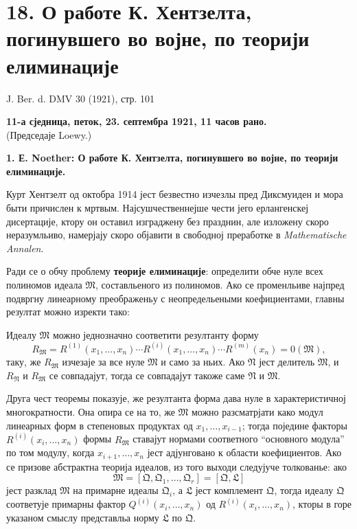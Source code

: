﻿\documentclass[11pt]{article}
\begin{document}

\setcounter{footnote}{0}
\section*{18. О работе К. Хентзелта, погинувшего во војне, по теорији елиминације}
\begin{center}
J. Ber. d. DMV 30 (1921), стр. 101
\end{center}

\begin{center}
\textbf{11-а сједница, петок, 23. септембра 1921, 11 часов рано.}\\
(Председаје Loewy.)
\end{center}

\textbf{1. Е. Noether: О работе К. Хентзелта, погинувшего во војне, по теорији елиминације.}

Курт Хентзелт од октобра 1914 јест безвестно изчезлы пред Диксмуиден и мора быти причислен к мртвым. Најсушчественнејше чести јего ерлангенскеј дисертације, ктору он оставил изграджену без празднин, але изложену скоро неразумльиво, намерјају скоро објавити в свободној преработке в \emph{Mathematische Annalen}.

Ради се о обчу проблему \textbf{теорије елиминације}: определити обче нуле всех полиномов идеала \(\mathfrak M\), составльеного из полиномов. Ако се променльиве најпред подвргну линеарному преображеньу с неопредельеными коефициентами, главны резултат можно изректи тако:

Идеалу \(\mathfrak M\) можно једнозначно соответити резултанту форму
\[
 R_{\mathfrak M}=R^{(1)}(x_1,
\ldots,x_n)\cdots R^{(i)}(x_1,
\ldots,x_n)\cdots R^{(m)}(x_n)=0(\mathfrak M),
\]
таку, же \(R_{\mathfrak M}\) изчезаје за все нуле \(\mathfrak M\) и само за ньих. Ако \(\mathfrak N\) јест делитель \(\mathfrak M\), и \(R_{\mathfrak N}\) и \(R_{\mathfrak M}\) се совпадајут, тогда се совпадајут такоже саме \(\mathfrak N\) и \(\mathfrak M\).

Друга чест теоремы показује, же резултанта форма дава нуле в характеристичној многократности. Она опира се на то, же \(\mathfrak M\) можно разсматрјати како модул линеарных форм в степеновых продуктах од \(x_1,
\ldots,x_{i-1}\); тогда поједине факторы \(R^{(i)}(x_i,
\ldots,x_n)\) формы \(R_{\mathfrak M}\) ставајут нормами соответного ``основного модула'' по том модулу, когда \(x_{i+1},
\ldots,x_n\) јест адјунговано к области коефициентов. Ако се призове абстрактна теорија идеалов, из того выходи следујуче толкованье: ако
\[
 \mathfrak M=[\mathfrak Q,\mathfrak Q_1,
\ldots,
\mathfrak Q_r]=[\mathfrak Q,\mathfrak L]
\]
јест разклад \(\mathfrak M\) на примарне идеалы \(\mathfrak Q_i\), а \(\mathfrak L\) јест комплемент \(\mathfrak Q\), тогда идеалу \(\mathfrak Q\) соответује примарны фактор \(Q^{(i)}(x_i,
\ldots,x_n)\) од \(R^{(i)}(x_i,
\ldots,x_n)\), кторы в горе указаном смыслу представльа норму \(\mathfrak L\) по \(\mathfrak Q\).

\clearpage
\end{document}

